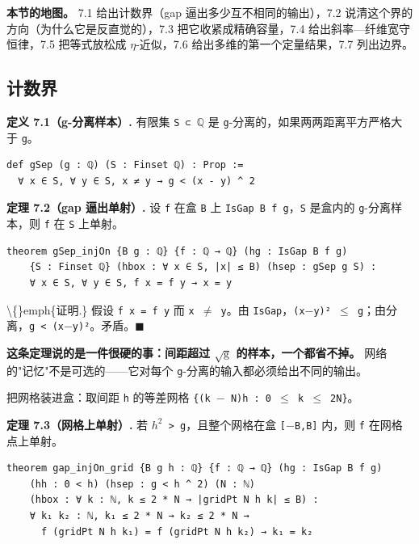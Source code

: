 \documentclass[11pt,a4paper]{ctexart}
\begin{document}
\textbf{本节的地图。} 7.1 给出计数界（gap 逼出多少互不相同的输出），7.2 说清这个界的方向（为什么它是反直觉的），7.3 把它收紧成精确容量，7.4 给出斜率—纤维宽守恒律，7.5 把等式放松成 \ensuremath{\eta}-近似，7.6 给出多维的第一个定量结果，7.7 列出边界。

\subsection{计数界}

\textbf{定义 7.1（g-分离样本）.} 有限集 \texttt{S ⊂ \ensuremath{\mathbb{Q}}} 是 \texttt{g}-分离的，如果两两距离平方严格大于 \texttt{g}。

\begin{lstlisting}
def gSep (g : ℚ) (S : Finset ℚ) : Prop :=
  ∀ x ∈ S, ∀ y ∈ S, x ≠ y → g < (x - y) ^ 2
\end{lstlisting}

\textbf{定理 7.2（gap 逼出单射）.} 设 \texttt{f} 在盒 \texttt{B} 上 \texttt{IsGap B f g}，\texttt{S} 是盒内的 \texttt{g}-分离样本，则 \texttt{f} 在 \texttt{S} 上单射。

\begin{lstlisting}
theorem gSep_injOn {B g : ℚ} {f : ℚ → ℚ} (hg : IsGap B f g)
    {S : Finset ℚ} (hbox : ∀ x ∈ S, |x| ≤ B) (hsep : gSep g S) :
    ∀ x ∈ S, ∀ y ∈ S, f x = f y → x = y
\end{lstlisting}

\textbackslash\{\}emph\{证明.\} 假设 \texttt{f x = f y} 而 \texttt{x \ensuremath{\ne} y}。由 \texttt{IsGap}，\texttt{(x\ensuremath{-}y)² \ensuremath{\le} g}；由分离，\texttt{g < (x\ensuremath{-}y)²}。矛盾。\ensuremath{\ensuremath{\blacksquare}}

\textbf{这条定理说的是一件很硬的事：间距超过 \texttt{\ensuremath{\sqrt{\mathrm{g}}}} 的样本，一个都省不掉。} 网络的"记忆"不是可选的——它对每个 \texttt{g}-分离的输入都必须给出不同的输出。

把网格装进盒：取间距 \texttt{h} 的等差网格 \texttt{\{(k \ensuremath{-} N)h : 0 \ensuremath{\le} k \ensuremath{\le} 2N\}}。

\textbf{定理 7.3（网格上单射）.} 若 \texttt{\ensuremath{h^{2}} > g}，且整个网格在盒 \texttt{[\ensuremath{-}B,B]} 内，则 \texttt{f} 在网格点上单射。

\begin{lstlisting}
theorem gap_injOn_grid {B g h : ℚ} {f : ℚ → ℚ} (hg : IsGap B f g)
    (hh : 0 < h) (hsep : g < h ^ 2) (N : ℕ)
    (hbox : ∀ k : ℕ, k ≤ 2 * N → |gridPt N h k| ≤ B) :
    ∀ k₁ k₂ : ℕ, k₁ ≤ 2 * N → k₂ ≤ 2 * N →
      f (gridPt N h k₁) = f (gridPt N h k₂) → k₁ = k₂
\end{lstlisting}
\end{document}
